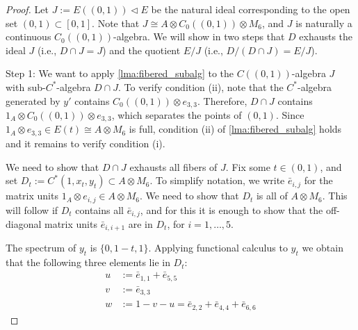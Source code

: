 \documentclass{amsart}
\theoremstyle{definition}
\begin{document}
\begin{proof}
    Let $J:=E((0,1))\lhd E$ be the natural ideal corresponding to the open set $(0,1)\subset[0,1]$.
    Note that $J\cong A\otimes C_0((0,1))\otimes M_6$, and $J$ is naturally a continuous $C_{0}((0,1))$-algebra.
    We will show in two steps that $D$ exhausts the ideal $J$ (i.e., $D\cap J=J$) and the quotient $E/J$ (i.e., $D/(D\cap J)=E/J$).

    Step 1:
    We want to apply \autoref{lma:fibered_subalg} to the $C((0,1))$-algebra $J$ with sub-{{$C^*$-al\-ge\-bra}}{} $D\cap J$.
    To verify condition (ii), note that the {{$C^*$-al\-ge\-bra}}{} generated by $y'$ contains $C_0((0,1))\otimes e_{3,3}$.
    Therefore, $D\cap J$ contains $1_A\otimes C_0((0,1))\otimes e_{3,3}$, which separates the points of $(0,1)$.
    Since $1_A\otimes e_{3,3}\in E(t)\cong A\otimes M_6$ is full,  condition (ii) of  \autoref{lma:fibered_subalg} holds and it remains to verify condition (i).

    We need to show that $D\cap J$ exhausts all fibers of $J$.
    Fix some $t\in (0,1)$, and set $D_t:=C^*(1,x_t,y_t)\subset A\otimes M_6$.
    To simplify notation, we write $\bar{e}_{i,j}$ for the matrix units $1_A\otimes e_{i,j}\in A\otimes M_6$.
    We need to show that $D_t$ is all of $A\otimes M_6$.
    This will follow if $D_t$ contains all $\bar{e}_{i,j}$, and for this it is enough to show that the off-diagonal matrix units $\bar{e}_{i,i+1}$ are in $D_t$, for $i=1,\ldots,5$.

    The spectrum of $y_t$ is $\{0,1-t,1\}$.
    Applying functional calculus to $y_t$ we obtain that the following three elements lie in $D_t$:
    \begin{align*}
        u &:=\bar{e}_{1,1}+\bar{e}_{5,5} \\
        v &:=\bar{e}_{3,3} \\
        w &:=1-v-u = \bar{e}_{2,2}+\bar{e}_{4,4}+\bar{e}_{6,6}
    \end{align*}


\end{proof}
\end{document}
